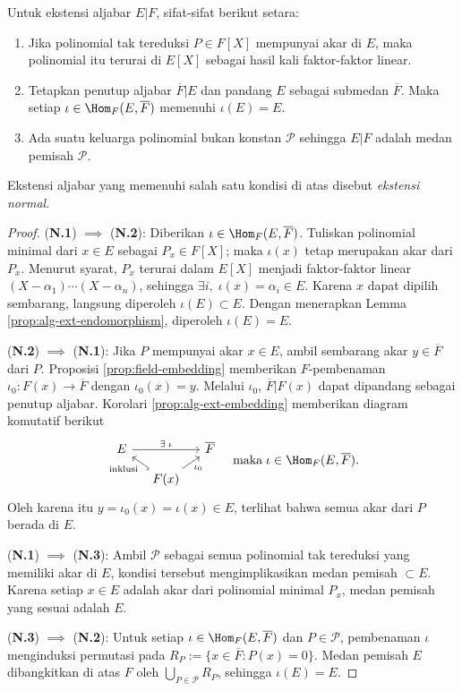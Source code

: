 \begin{definition-theorem}\label{def:normal-ext}
	Untuk ekstensi aljabar $E|F$, sifat-sifat berikut setara:
	\begin{enumerate}[\bfseries {N}.1]
		\item Jika polinomial tak tereduksi $P \in F[X]$ mempunyai akar di $E$, maka polinomial itu terurai di $E[X]$ sebagai hasil kali faktor-faktor linear.
		\item Tetapkan penutup aljabar $\overline{F}|E$ dan pandang $E$ sebagai submedan $\overline{F}$. Maka setiap $\iota \in \Hom_F(E, \overline{F})$ memenuhi $\iota(E)=E$.
		\item Ada suatu keluarga polinomial bukan konstan $\mathcal{P}$ sehingga $E|F$ adalah medan pemisah $\mathcal{P}$.
	\end{enumerate}
	Ekstensi aljabar yang memenuhi salah satu kondisi di atas disebut \emph{ekstensi normal}.
\end{definition-theorem}
\begin{proof}
	(\textbf{N.1}) $\implies$ (\textbf{N.2}): Diberikan $\iota \in \Hom_F(E, \overline{F})$. Tuliskan polinomial minimal dari $x \in E$ sebagai $P_x \in F[X]$; maka $\iota(x)$ tetap merupakan akar dari $P_x$. Menurut syarat, $P_x$ terurai dalam $E[X]$ menjadi faktor-faktor linear $(X-\alpha_1) \cdots (X-\alpha_n)$, sehingga $\exists i,\; \iota(x) = \alpha_i \in E$. Karena $x$ dapat dipilih sembarang, langsung diperoleh $\iota(E) \subset E$. Dengan menerapkan Lemma \ref{prop:alg-ext-endomorphism}, diperoleh $\iota(E)=E$.
	
	(\textbf{N.2}) $\implies$ (\textbf{N.1}): Jika $P$ mempunyai akar $x \in E$, ambil sembarang akar $y \in \overline{F}$ dari $P$. Proposisi \ref{prop:field-embedding} memberikan $F$-pembenaman $\iota_0: F(x) \to \overline{F}$ dengan $\iota_0(x)=y$. Melalui $\iota_0$, $\overline{F}|F(x)$ dapat dipandang sebagai penutup aljabar. Korolari \ref{prop:alg-ext-embedding} memberikan diagram komutatif berikut
	\[\begin{tikzcd}[row sep=small, column sep=small]
		E \arrow[rr, "\exists\; \iota"] & & \overline{F} \\
		& F(x) \arrow[hookrightarrow, lu, "\text{inklusi}"] \arrow[ru, "\iota_0"'] &
	\end{tikzcd} \quad \text{maka}\; \iota \in \Hom_F(E, \overline{F}). \]
	Oleh karena itu $y = \iota_0(x) = \iota(x) \in E$, terlihat bahwa semua akar dari $P$ berada di $E$.
	
	(\textbf{N.1}) $\implies$ (\textbf{N.3}): Ambil $\mathcal{P}$ sebagai semua polinomial tak tereduksi yang memiliki akar di $E$, kondisi tersebut mengimplikasikan medan pemisah $\subset E$. Karena setiap $x \in E$ adalah akar dari polinomial minimal $P_x$, medan pemisah yang sesuai adalah $E$.
	
	(\textbf{N.3}) $\implies$ (\textbf{N.2}): Untuk setiap $\iota \in \Hom_F(E, \overline{F})$ dan $P \in \mathcal{P}$, pembenaman $\iota$ menginduksi permutasi pada $R_P := \{x \in \overline{F}: P(x)=0 \}$. Medan pemisah $E$ dibangkitkan di atas $F$ oleh $\bigcup_{P \in \mathcal{P}} R_P$, sehingga $\iota(E)=E$.
\end{proof}

